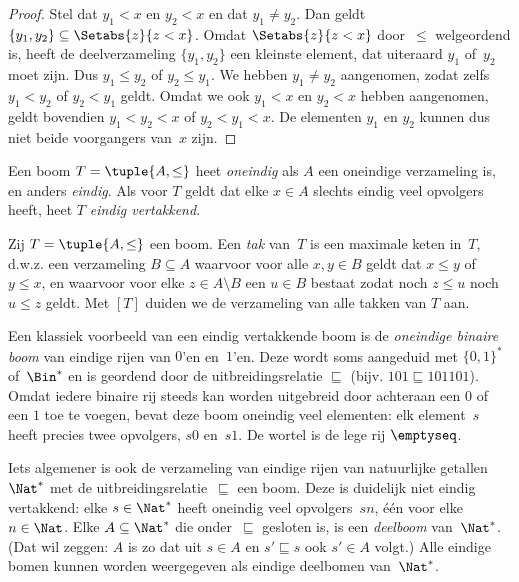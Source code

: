 \documentclass[openany]{memoir}
\begin{document}
\begin{proof}
  Stel dat $y_1 < x$ en $y_2 < x$ en dat $y_1 \neq y_2$. Dan geldt
  $\{y_1, y_2\} \subseteq \Setabs{z}{z<x}$. Omdat
  $\Setabs{z}{z<x}$ door~$\le$ welgeordend is, heeft de deelverzameling
  $\{y_1, y_2\}$ een kleinste element, dat uiteraard $y_1$ of~$y_2$
  moet zijn. Dus $y_1 \le y_2$ of $y_2 \le y_1$. We hebben
  $y_1 \neq y_2$ aangenomen, zodat zelfs $y_1 < y_2$ of $y_2 < y_1$
  geldt. Omdat we ook $y_1 < x$ en $y_2 < x$ hebben aangenomen, geldt
  bovendien $y_1 < y_2 < x$ of $y_2 < y_1 < x$. De elementen $y_1$
  en $y_2$ kunnen dus niet beide voorgangers van~$x$ zijn.
\end{proof}

\begin{defn}
Een boom $T = \tuple{A, \le}$ heet \emph{oneindig} als $A$ een
oneindige verzameling is, en anders \emph{eindig}. Als voor $T$ geldt
dat elke $x \in A$ slechts eindig veel opvolgers heeft, heet $T$ \emph{eindig
vertakkend}.
\end{defn}

\begin{defn}[Takken]
Zij $T = \tuple{A, \le}$ een boom. Een \emph{tak} van~$T$ is een
maximale keten in~$T$, d.w.z. een verzameling $B \subseteq A$ waarvoor
voor alle $x, y \in B$ geldt dat $x \le y$ of $y \le x$, en waarvoor
voor elke $z \in A \setminus B$ een $u \in B$ bestaat zodat noch
$z \le u$ noch $u \le z$ geldt.
%
Met $[T]$ duiden we de verzameling van alle takken van $T$ aan.
\end{defn}

\begin{ex}
Een klassiek voorbeeld van een eindig vertakkende boom is de
\emph{oneindige binaire boom} van eindige rijen van $0$'en en~$1$'en.
Deze wordt soms aangeduid met $\{0,1\}^*$ of~$\Bin^*$ en is geordend
door de uitbreidingsrelatie $\sqsubseteq$ (bijv.
$101 \sqsubseteq 101101$). Omdat iedere binaire rij steeds kan worden
uitgebreid door achteraan een $0$ of een $1$ toe te voegen, bevat deze
boom oneindig veel elementen: elk element~$s$ heeft precies twee
opvolgers, $s0$ en~$s1$. De wortel is de lege rij $\emptyseq$.
\end{ex}

\begin{ex}
Iets algemener is ook de verzameling van eindige rijen van natuurlijke
getallen~$\Nat^*$ met de uitbreidingsrelatie~$\sqsubseteq$ een boom.
Deze is duidelijk niet eindig vertakkend: elke $s \in \Nat^*$ heeft
oneindig veel opvolgers~$sn$, één voor elke $n \in \Nat$. Elke
$A \subseteq \Nat^*$ die onder~$\sqsubseteq$ gesloten is, is een
\emph{deelboom} van~$\Nat^*$. (Dat wil zeggen: $A$ is zo dat uit
$s \in A$ en $s' \sqsubseteq s$ ook $s' \in A$ volgt.) Alle eindige
bomen kunnen worden weergegeven als eindige deelbomen van~$\Nat^*$.
\end{ex}
\end{document}
